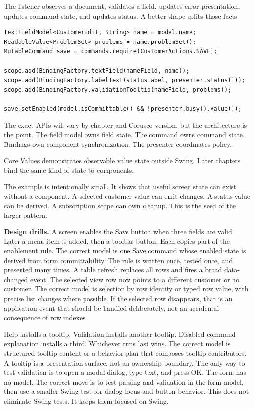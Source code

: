 The listener observes a document, validates a field, updates error presentation, updates command state, and updates status. A better shape splits those facts.

\begin{lstlisting}[caption={The same facts with named owners.}]
TextFieldModel<CustomerEdit, String> name = model.name;
ReadableValue<ProblemSet> problems = name.problemSet();
MutableCommand save = commands.require(CustomerActions.SAVE);

scope.add(BindingFactory.textField(nameField, name));
scope.add(BindingFactory.labelText(statusLabel, presenter.status()));
scope.add(BindingFactory.validationTooltip(nameField, problems));

save.setEnabled(model.isCommittable() && !presenter.busy().value());
\end{lstlisting}

The exact APIs will vary by chapter and Corusco version, but the architecture is the point. The field model owns field state. The command owns command state. Bindings own component synchronization. The presenter coordinates policy.

\begin{examplebox}{Core Values}
\coreExample{} demonstrates observable value state outside Swing. Later chapters bind the same kind of state to components.
\end{examplebox}

The example is intentionally small. It shows that useful screen state can exist without a component. A selected customer value can emit changes. A status value can be derived. A subscription scope can own cleanup. This is the seed of the larger pattern.

\textbf{Design drills.} A screen enables the Save button when three fields are valid. Later a menu item is added, then a toolbar button. Each copies part of the enablement rule. The correct model is one Save command whose enabled state is derived from form committability. The rule is written once, tested once, and presented many times. A table refresh replaces all rows and fires a broad data-changed event. The selected view row now points to a different customer or no customer. The correct model is selection by row identity or typed row value, with precise list changes where possible. If the selected row disappears, that is an application event that should be handled deliberately, not an accidental consequence of row indexes.

Help installs a tooltip. Validation installs another tooltip. Disabled command explanation installs a third. Whichever runs last wins. The correct model is structured tooltip content or a behavior plan that composes tooltip contributors. A tooltip is a presentation surface, not an ownership boundary. The only way to test validation is to open a modal dialog, type text, and press OK. The form has no model. The correct move is to test parsing and validation in the form model, then use a smaller Swing test for dialog focus and button behavior. This does not eliminate Swing tests. It keeps them focused on Swing.


